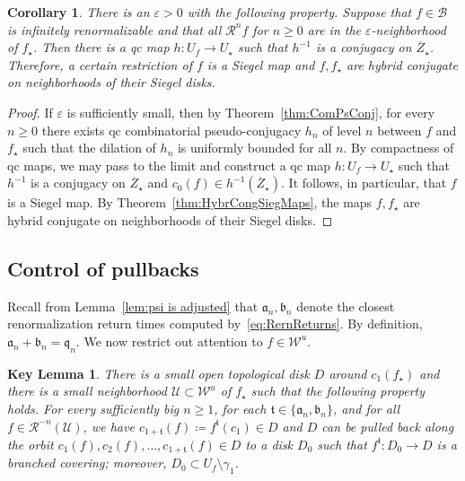 \documentclass[]{amsart}
\newcommand\RR{\mathcal{R}}
\newcommand{\str}{{\star}}
\renewcommand{\aa}{{\mathfrak{a}}}
\newcommand{\bb}{{\mathfrak{b}}}
\renewcommand{\qq}{\mathfrak{q}}
\renewcommand{\tt}{\mathfrak{t}}
\newcommand\WW{\mathcal{W}}
\newcommand\UU{\mathcal{U}}
\newcommand\BB{\mathcal{B}}
\newtheorem{cor}[thm]{Corollary}
\newtheorem{keylem}[thm]{Key Lemma}
\theoremstyle{remark}
\numberwithin{equation}{section}
\theoremstyle{definition}
\begin{document}
\begin{cor} 
\label{cor:inf ren are hybr conj}
There is an $\varepsilon>0$ with the following property. Suppose that $f\in \BB$ is infinitely renormalizable and that all $\RR^n  f$ for $n\ge 0$ are in the $\varepsilon$-neighborhood of $f_\str$. Then there is a qc map $h\colon U_f\to U_\str$ such that $h^{-1}$ is a conjugacy on $\overline Z_\str$. Therefore, a certain restriction of $f$ is a Siegel map and $f,f_\str$ are hybrid conjugate on neighborhoods of their Siegel disks.
\end{cor}
\begin{proof}
If $\varepsilon$ is sufficiently small, then by Theorem~\ref{thm:ComPsConj}, for every $n\ge 0$ there exists qc combinatorial pseudo-conjugacy $h_n$ of level $n$ between $f$ and $f_\str$ such that the dilation of $h_n$ is uniformly bounded for all $n$. By compactness of qc maps, we may pass to the limit and construct a qc map $h\colon U_f\to U_\str$ such that $h^{-1}$ is a conjugacy on $\overline Z_\str$ and $c_0(f)\in h^{-1}(\overline Z_\str)$. It follows, in particular, that $f$ is a Siegel map. By Theorem~\ref{thm:HybrCongSiegMaps}, the maps $f,f_\str$ are hybrid conjugate on neighborhoods of their Siegel disks.
\end{proof}
\subsection{Control of pullbacks}
Recall from Lemma~\ref{lem:psi is adjusted} that  $\aa_n, \bb_n$ denote the closest renormalization return times computed by~\eqref{eq:RernReturns}. By definition, $\aa_n+ \bb_n=\qq_n$. We now restrict out attention to $f\in \WW^u$.


\begin{keylem}
\label{keylem:ContrOfPullbacks}
There is a small open topological disk $D$ around $c_1(f_\str)$ and there is a small neighborhood $\UU\subset \WW^u$ of $f_\str$ such that the following property holds. For every sufficiently big $n\ge 1$, for each $\tt\in \{\aa_n,\bb_n\}$, and for all $f\in \RR^{-n} (\UU)$, we have ${c_{1+\tt}(f)\coloneqq f^\tt(c_1)\in D
}$ and $D$ can be pulled back along the orbit $c_1(f), c_2(f),\dots , c_{1+\tt}(f)\in D$ to a disk $D_{0}$ such that $f^{\tt}\colon D_{0} \to D$ is a branched covering; moreover, $D_0\subset U_{f}\setminus \gamma_1$.
\end{keylem}
\end{document}
